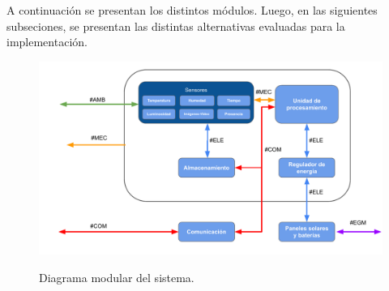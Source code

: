 %
%



A continuación se presentan los distintos módulos. Luego, en las siguientes subseciones, se presentan las distintas alternativas evaluadas para la implementación.

\begin{figure}[H]
	\centering
	\includegraphics[width=0.9\linewidth]{ImagenesFactibilidad/EsquemaModular}
	\label{fig:esquema_modular}
	\caption{Diagrama modular del sistema.}
\end{figure}





%















